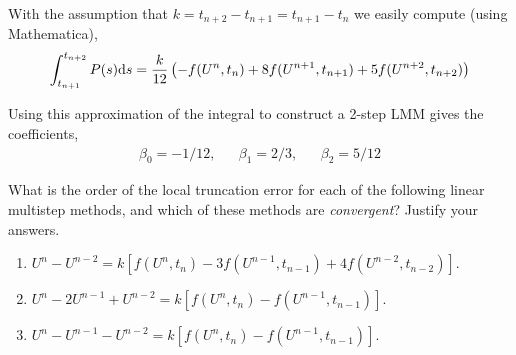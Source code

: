 \documentclass[10pt]{article}
\begin{document}
\begin{solution}[Solution]
\begin{enumerate}[label=(\alph*)]
     With the assumption that \( k = t_{n+2}-t_{n+1} = t_{n+1} - t_n \) we easily compute (using Mathematica),
     \begin{align*}
         \int_{t_{n+1}}^{t_{n+2}} P(s) \mathrm{d} s = \dfrac{k}{12} \left( - f(U^n,t_n) + 8f(U^{n+1},t_{n+1}) + 5f(U^{n+2},t_{n+2})  \right)
     \end{align*}

     Using this approximation of the integral to construct a 2-step LMM gives the coefficients,
     \begin{align*}
         \beta_0 = -1/12, &&
         \beta_1 = 2/3, &&
         \beta_2 = 5/12
     \end{align*}


\end{enumerate}

\end{solution}

\begin{problem}[Problem 2]
What is the order of the local truncation error for each of the following linear multistep methods, and which of these methods are {\em convergent}?  Justify your answers.
\begin{enumerate}[label=(\alph*)]
\item \(U^{n} - U^{n-2} = k[ f( U^n , t_n ) - 3 f( U^{n-1} , t_{n-1} ) + 4 f( U^{n-2} , t_{n-2} ) ]\).
\item \(U^n - 2 U^{n-1} + U^{n-2} = k [ f( U^n , t_n ) - f( U^{n-1} , t_{n-1} ) ]\).
\item \(U^n - U^{n-1} - U^{n-2} = k [ f( U^n , t_n ) - f( U^{n-1} , t_{n-1} )]\).
\end{enumerate}
\end{problem}
\end{document}
